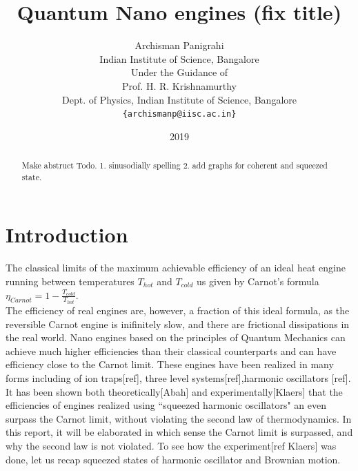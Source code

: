 \documentclass[12pt, twoside]{article}
\begin{document}
\setpagewiselinenumbers


\title{Quantum Nano engines (fix title)}

\date{2019}



\author{Archisman Panigrahi\\
	\footnotesize Indian Institute of Science, Bangalore\\
	\footnotesize Under the Guidance of\\
	Prof. H. R. Krishnamurthy\\
	\footnotesize Dept. of Physics, Indian Institute of Science, Bangalore
	\footnotesize \texttt{\{archismanp@iisc.ac.in\}} \\ }


\maketitle

\begin{abstract}

Make abstruct
Todo. 1. sinusodially spelling
2. add graphs for coherent and squeezed state.

\end{abstract}

\newpage\tableofcontents

\section{Introduction}
The classical limits of the maximum achievable efficiency of an ideal heat engine running between temperatures $T_{hot}$ and $T_{cold}$ us given by Carnot's formula $\eta_{Carnot} = 1 - \frac{T_{cold}}{T_{hot}}$.\\
The efficiency of real engines are, however, a fraction of this ideal formula, as the reversible Carnot engine is inifinitely slow, and there are frictional dissipations in the real world.
Nano engines based on the principles of Quantum Mechanics can achieve much higher efficiencies than their classical counterparts and can have efficiency close to the Carnot limit.
These engines have been realized in many forms including of ion traps[ref], three level systems[ref],harmonic oscillators [ref].
It has been shown both theoretically[Abah] and experimentally[Klaers] that the efficiencies of engines realized using ``squeezed harmonic oscillators" an even surpass the Carnot limit, without violating the second law of thermodynamics. In this report, it will be elaborated in which sense the Carnot limit is surpassed, and why the second law is not violated.
To see how the experiment[ref Klaers] was done, let us recap squeezed states of harmonic oscillator and Brownian motion.
\end{document}

